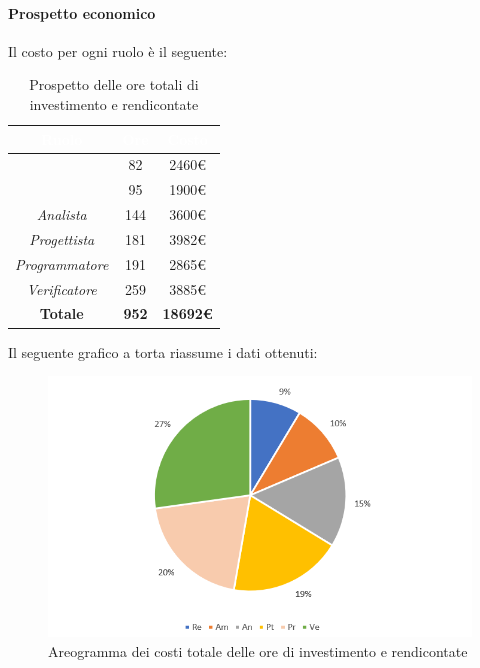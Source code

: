 \paragraph{Prospetto economico}
Il costo per ogni ruolo è il seguente:
\begin{table}[H]
	\begin{center}
		\begin{tabular}{ |c c c| }
		\rowcolor{darkblue} 
		\textcolor{white}{\textbf{Ruolo}} & \textcolor{white}{\textbf{Ore}} & \textcolor{white}{\textbf{Costo}} \\ \hline
		\textit{\Responsabile} 		& 82 	& 2460€ \\ \hline
		\textit{\Amministratore} 	& 95 	& 1900€ \\ \hline
		\textit{Analista} 			& 144 	& 3600€ \\ \hline
		\textit{Progettista} 		& 181 	& 3982€ \\ \hline
		\textit{Programmatore}  	& 191 	& 2865€ \\ \hline
		\textit{Verificatore} 		& 259 	& 3885€ \\ \hline
		\textbf{Totale} & \textbf{952} & \textbf{18692€} \\  \hline
		\end{tabular}
	\caption{Prospetto delle ore totali di investimento e rendicontate}
	\end{center}
\end{table}
Il seguente grafico a torta riassume i dati ottenuti:
\begin{figure}[H]
    \centering
    \includegraphics[scale = 0.75]{Immagini/TotaleTorta.png}
    \caption{ Areogramma dei costi totale delle ore di investimento e rendicontate}
    \label{fig:areogramma ripartizione ore totali di investimento e rendicontate}
\end{figure}
\newpage

